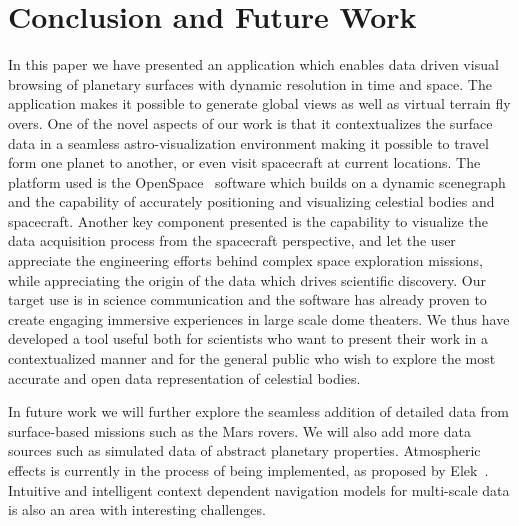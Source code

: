 \documentclass[journal]{vgtc}                %
\begin{document}

\section{Conclusion and Future Work} \label{sec:conclusion}
In this paper we have presented an application which enables data driven visual browsing of planetary surfaces with dynamic resolution in time and space. The application makes it possible to generate global views as well as virtual terrain fly overs. One of the novel aspects of our work is that it contextualizes the surface data in a seamless astro-visualization environment making it possible to travel form one planet to another, or even visit spacecraft at current locations. The platform used is the OpenSpace~\cite{Bock_2015} software which builds on a dynamic scenegraph and the capability of accurately positioning and visualizing celestial bodies and spacecraft. Another key component presented is the capability to visualize the data acquisition process from the spacecraft perspective, and let the user appreciate the engineering efforts behind complex space exploration missions, while appreciating the origin of the data which drives scientific discovery. Our target use is in science communication and the software has already proven to create engaging immersive experiences in large scale dome theaters. We thus have developed a tool useful both for scientists who want to present their work in a contextualized manner and for the general public who wish to explore the most accurate and open data representation of celestial bodies.

In future work we will further explore the seamless addition of detailed data from surface-based missions such as the Mars rovers. We will also add more data sources such as simulated data of abstract planetary properties. Atmospheric effects is currently in the process of being implemented, as proposed by Elek~\cite{elek2009rendering}. Intuitive and intelligent context dependent navigation models for multi-scale data is also an area with interesting challenges. 



%

%
%
%


\end{document}
